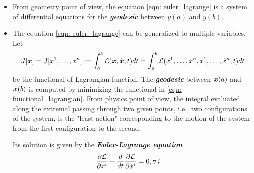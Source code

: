 \documentclass[11pt]{article}
\begin{document}
\begin{itemize}
\begin{proof}
Using the necessary condition for extreme $y=y(x)$ of continous functional, we have
\begin{align*}
\delta J[h]   &=  \int_{a}^{b} \brac{\partdiff{F}{y}\,h + \partdiff{F}{\dot{y}}\,\dot{h}} dx =  0
\end{align*} for all admissible $h$. According to Lemma \eqref{eqn: cal_var_lemma_4}, $\alpha(x) = \partdiff{F}{y}$ and $\beta(x) = \partdiff{F}{\dot{y}}$,
\begin{align*}
\partdiff{F}{y} - \frac{d}{dx}\partdiff{F}{\dot{y}} &= 0. \qed
\end{align*}
\end{proof}

\item From geometry point of view, the equation \eqref{eqn: euler_lagrange} is a system of differential equations for the \underline{\textbf{\emph{geodesic}}} between $y(a)$ and $y(b)$.

\item The equation \eqref{eqn: euler_lagrange} can be generalized to multiple variables. Let 
\begin{align}
J[\boldsymbol{x}]=  J[x^1, \ldots, x^n] := \int_{a}^{b}{\mathcal L}(\boldsymbol{x}, \dot{\boldsymbol{x}}, t)dt =  \int_{a}^{b}{\mathcal L}(x^1, \ldots, x^n, \dot{x}^1, \ldots, \dot{x}^{n}, t) dt \label{eqn: functional_lagrangian}
\end{align}  be the functional of Lagrangian function.  
The \emph{\textbf{geodesic}} between $\boldsymbol{x}(a)$ and $\boldsymbol{x}(b)$ is computed by minimizing the functional in \eqref{eqn: functional_lagrangian}. From physics point of view, the integral evaluated along the extremal passing through two given points, i.e., two configurations of the system, is the "least action" corresponding to the motion of the system from the first configuration to the second.

Its solution is given by the \emph{\textbf{Euler-Lagrange equation}}
\begin{align}
\frac{\partial {\mathcal L}}{ \partial x^{i}} - \frac{d}{dt}\frac{\partial {\mathcal L}}{ \partial \dot{x}^{i}} &= 0, \forall\,i. \label{eqn: euler_lagrange_2}
\end{align}
\end{itemize}
\end{document}
